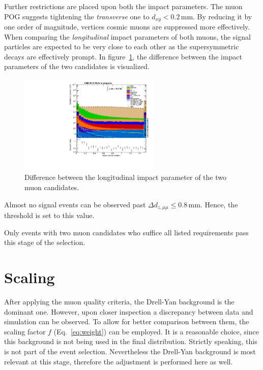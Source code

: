 Further restrictions are placed upon both the impact parameters. The muon POG suggests tightening the \textit{transverse} one to $d_{xy} < 0.2\,\text{mm}$. By reducing it by one order of magnitude, vertices  cosmic muons are suppressed more effectively. When comparing the \textit{longitudinal} impact parameters of both muons, the signal particles are expected to be very close to each other as the supersymmetric decays are effectively prompt. In figure~\ref{fig:deltadz}, the difference between the impact parameters of the two candidates is visualized.

\begin{figure}[ht!]
  \centering
    \includegraphics[width=0.6\textwidth]{plots/reliso.pdf}
  \caption{Difference between the longitudinal impact parameter of the two muon candidates.}
  \label{fig:deltadz}
\end{figure}

\noindent Almost no signal events can be observed past $\Delta d_{z, \mu\mu} \leq 0.8\,\text{mm}$. Hence, the threshold is set to this value.

Only events with two muon candidates who suffice all listed requirements pass this stage of the selection.



\section{Scaling}
\label{sec:scaling}

After applying the muon quality criteria, the Drell-Yan background is the dominant one. However, upon closer inspection a discrepancy between data and simulation can be observed. To allow for better comparison between them, the scaling factor $f$ (Eq.~\eqref{eq:weight}) can be employed. It is a reasonable choice, since this background is not being used in the final distribution. Strictly speaking, this is not part of the event selection. Nevertheless the Drell-Yan background is most relevant at this stage, therefore the adjustment is performed here as well.

